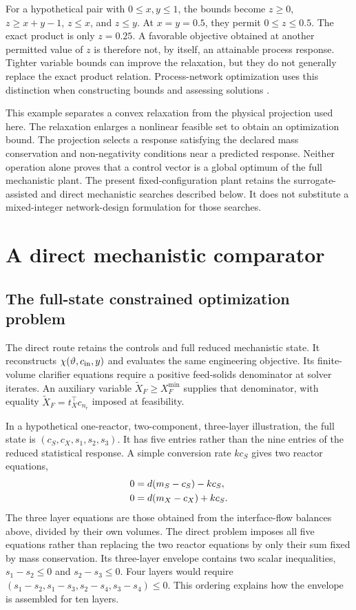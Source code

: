 For a hypothetical pair with $0\leq x,y\leq1$, the bounds become $z\geq0$, $z\geq x+y-1$, $z\leq x$, and $z\leq y$. At $x=y=0.5$, they permit $0\leq z\leq0.5$. The exact product is only $z=0.25$. A favorable objective obtained at another permitted value of $z$ is therefore not, by itself, an attainable process response. Tighter variable bounds can improve the relaxation, but they do not generally replace the exact product relation. Process-network optimization uses this distinction when constructing bounds and assessing solutions \citep{RubioCastro2013,YangNetwork2014}.

This example separates a convex relaxation from the physical projection used here. The relaxation enlarges a nonlinear feasible set to obtain an optimization bound. The projection selects a response satisfying the declared mass conservation and non-negativity conditions near a predicted response. Neither operation alone proves that a control vector is a global optimum of the full mechanistic plant. The present fixed-configuration plant retains the surrogate-assisted and direct mechanistic searches described below. It does not substitute a mixed-integer network-design formulation for those searches.

\section{A direct mechanistic comparator}

\subsection{The full-state constrained optimization problem}

The direct route retains the controls and full reduced mechanistic state. It reconstructs $\chi(\vartheta,c_{\rm in},y)$ and evaluates the same engineering objective. Its finite-volume clarifier equations require a positive feed-solids denominator at solver iterates. An auxiliary variable $\widetilde X_F\ge X_F^{\min}$ supplies that denominator, with equality $\widetilde X_F=t_X^\top c_{n_r}$ imposed at feasibility.

In a hypothetical one-reactor, two-component, three-layer illustration, the full state is $(c_S,c_X,s_1,s_2,s_3)$. It has five entries rather than the nine entries of the reduced statistical response. A simple conversion rate $kc_S$ gives two reactor equations,
\begin{align}
\equationname{Illustrative direct reactor equation for the consumed component}
0&=d(m_S-c_S)-kc_S,\\
\equationname{Illustrative direct reactor equation for the produced component}
0&=d(m_X-c_X)+kc_S.
\end{align}
The three layer equations are those obtained from the interface-flow balances above, divided by their own volumes. The direct problem imposes all five equations rather than replacing the two reactor equations by only their sum fixed by mass conservation. Its three-layer envelope contains two scalar inequalities, $s_1-s_2\le0$ and $s_2-s_3\le0$. Four layers would require $(s_1-s_2,s_1-s_3,s_2-s_4,s_3-s_4)\le0$. This ordering explains how the envelope is assembled for ten layers.


